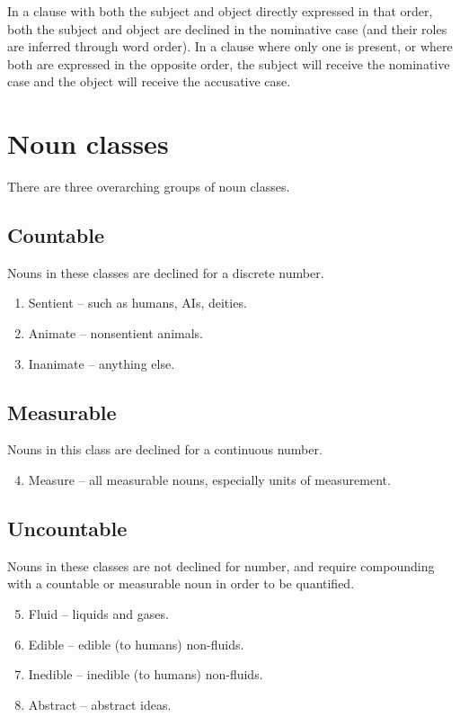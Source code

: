 \documentclass{book}
\begin{document}
In a clause with both the subject and object directly expressed in that order, both the subject and object are declined in the nominative case (and their roles are inferred through word order). In a clause where only one is present, or where both are expressed in the opposite order, the subject will receive the nominative case and the object will receive the accusative case.

\section{Noun classes}

There are three overarching groups of noun classes.

\subsection{Countable}

Nouns in these classes are declined for a discrete number.

\begin{enumerate}
    \item Sentient -- such as humans, AIs, deities.
    \item Animate -- nonsentient animals.
    \item Inanimate -- anything else.
\end{enumerate}

\subsection{Measurable}

Nouns in this class are declined for a continuous number.

\begin{enumerate}
    \setcounter{enumi}{3}
    \item Measure -- all measurable nouns, especially units of measurement.
\end{enumerate}

\subsection{Uncountable}

Nouns in these classes are not declined for number, and require compounding with a countable or measurable noun in order to be quantified.

\begin{enumerate}
    \setcounter{enumi}{4}
    \item Fluid -- liquids and gases.
    \item Edible -- edible (to humans) non-fluids.
    \item Inedible -- inedible (to humans) non-fluids.
    \item Abstract -- abstract ideas.
\end{enumerate}
\end{document}
